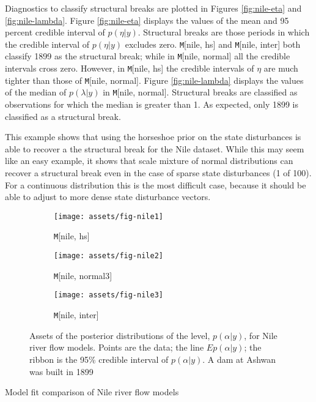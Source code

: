 \documentclass{article}
\newcommand{\Model}[2]{\texttt{M}[#1, #2]}
\begin{document}
Diagnostics to classify structural breaks are plotted in Figures \ref{fig:nile-eta} and \ref{fig:nile-lambda}.
Figure \ref{fig:nile-eta} displays the values of the mean and 95 percent credible interval of $p(\eta | y)$.
Structural breaks are those periods in which the credible interval of $p(\eta | y)$ excludes zero.
\Model{nile}{hs} and \Model{nile}{inter} both classify 1899 as the structural break; while in \Model{nile}{normal} all the credible intervals cross zero.
However, in \Model{nile}{hs} the credible intervals of $\eta$ are much tighter than those of \Model{nile}{normal}.
Figure \ref{fig:nile-lambda} displays the values of the median of $p(\lambda | y)$ in \Model{nile}{normal}.
Structural breaks are classified as observations for which the median is greater than 1.
As expected, only 1899 is classified as a structural break.

This example shows that using the horseshoe prior on the state disturbances is able to recover a the structural break for the Nile dataset.
While this may seem like an easy example, it shows that scale mixture of normal distributions can recover a structural break even in the case of sparse state disturbances (1 of 100).
For a continuous distribution this is the most difficult case, because it should be able to adjust to more dense state disturbance vectors.

\begin{figure}[htpb]
  \centering
  \begin{subfigure}{1.0\textwidth}
    \texttt{[image: assets/fig-nile1]}
    \caption{\Model{nile}{hs}}
    \label{fig:nile-posterior-1}    
  \end{subfigure}
  \begin{subfigure}{1.0\textwidth}
    \texttt{[image: assets/fig-nile2]}
    \caption{\Model{nile}{normal3}}
    \label{fig:nile-posterior-2}
  \end{subfigure}
  \begin{subfigure}{1.0\textwidth}
    \texttt{[image: assets/fig-nile3]}
    \caption{\Model{nile}{inter}}
    \label{fig:nile-posterior-3}
  \end{subfigure}
  \caption{Assets of the posterior distributions of the level, $p(\alpha | y)$, for Nile river flow models. Points are the data; the line $E p(\alpha | y)$; the ribbon is the 95\% credible interval of $p(\alpha | y)$. A dam at Ashwan was built in 1899}
  \label{fig:nile-posterior}
\end{figure}

\begin{table}[htpb]
  \centering
  
  \caption{Model fit comparison of Nile river flow models}
  \label{tab:nile-fits}
\end{table}
\end{document}
